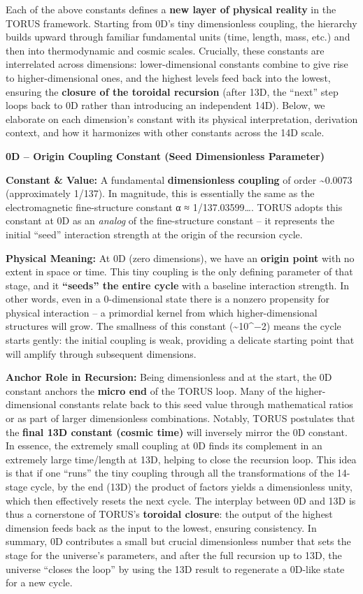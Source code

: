 Each of the above constants defines a \textbf{new layer of physical
reality} in the TORUS framework. Starting from 0D's tiny dimensionless
coupling, the hierarchy builds upward through familiar fundamental units
(time, length, mass, etc.) and then into thermodynamic and cosmic
scales. Crucially, these constants are interrelated across dimensions:
lower-dimensional constants combine to give rise to higher-dimensional
ones, and the highest levels feed back into the lowest, ensuring the
\textbf{closure of the toroidal recursion} (after 13D, the ``next'' step
loops back to 0D rather than introducing an independent 14D)​. Below, we
elaborate on each dimension's constant with its physical interpretation,
derivation context, and how it harmonizes with other constants across
the 14D scale.

\textbf{0D -- Origin Coupling Constant (Seed Dimensionless Parameter)}

\textbf{Constant \& Value:} A fundamental \textbf{dimensionless
coupling} of order \textasciitilde{}0.0073 (approximately 1/137)​. In
magnitude, this is essentially the same as the electromagnetic
fine-structure constant α ≈ 1/137.03599\ldots{}​. TORUS adopts this
constant at 0D as an \emph{analog} of the fine-structure constant -- it
represents the initial ``seed'' interaction strength at the origin of
the recursion cycle.

\textbf{Physical Meaning:} At 0D (zero dimensions), we have an
\textbf{origin point} with no extent in space or time. This tiny
coupling is the only defining parameter of that stage, and it
\textbf{``seeds'' the entire cycle} with a baseline interaction
strength​. In other words, even in a 0-dimensional state there is a
nonzero propensity for physical interaction -- a primordial kernel from
which higher-dimensional structures will grow. The smallness of this
constant (\textasciitilde{}10\^{}−2) means the cycle starts gently: the
initial coupling is weak, providing a delicate starting point that will
amplify through subsequent dimensions​.

\textbf{Anchor Role in Recursion:} Being dimensionless and at the start,
the 0D constant anchors the \textbf{micro end} of the TORUS loop. Many
of the higher-dimensional constants relate back to this seed value
through mathematical ratios or as part of larger dimensionless
combinations. Notably, TORUS postulates that the \textbf{final 13D
constant (cosmic time)} will inversely mirror the 0D constant​. In
essence, the extremely small coupling at 0D finds its complement in an
extremely large time/length at 13D, helping to close the recursion loop.
This idea is that if one ``runs'' the tiny coupling through all the
transformations of the 14-stage cycle, by the end (13D) the product of
factors yields a dimensionless unity, which then effectively resets the
next cycle​. The interplay between 0D and 13D is thus a cornerstone of
TORUS's \textbf{toroidal closure}: the output of the highest dimension
feeds back as the input to the lowest, ensuring consistency. In summary,
0D contributes a small but crucial dimensionless number that sets the
stage for the universe's parameters, and after the full recursion up to
13D, the universe ``closes the loop'' by using the 13D result to
regenerate a 0D-like state for a new cycle​.

